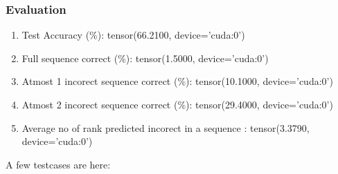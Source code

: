 \documentclass[journal,12pt,onecolumn]{IEEEtran}
\begin{document}
\subsubsection{Evaluation}
\begin{enumerate}
	\item Test Accuracy (\%): tensor(66.2100, device='cuda:0')
	\item Full sequence correct (\%): tensor(1.5000, device='cuda:0')
	\item Atmost 1 incorect sequence correct (\%): tensor(10.1000, device='cuda:0')
	\item Atmost 2 incorect sequence correct (\%): tensor(29.4000, device='cuda:0')
	\item Average no of rank predicted incorect in a sequence : tensor(3.3790, device='cuda:0')

\end{enumerate}
A few testcases are here:
\end{document}
